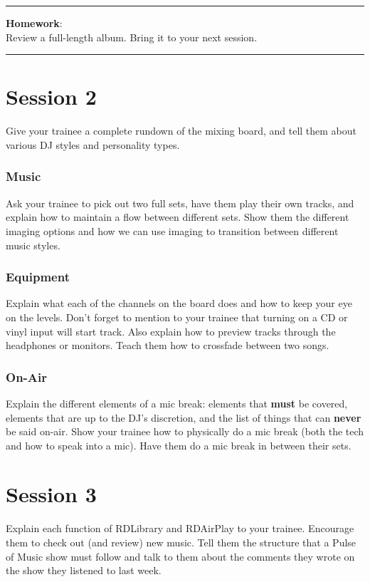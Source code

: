\documentclass{witrman}
\newcommand{\makehomework}[1]{%
\vspace{1mm}
\rule{\textwidth}{1pt}
\textbf{Homework}:\\
#1\\
\rule{\textwidth}{1pt}
}
\begin{document}
\makehomework{Review a full-length album.  Bring it to your next session.}


\chapter{Session 2}

Give your trainee a complete rundown of the mixing board, and tell them about
various DJ styles and personality types.

\subsection{Music}

Ask your trainee to pick out two full sets, have them play their own tracks, and
explain how to maintain a flow between different sets.  Show them the different
imaging options and how we can use imaging to transition between different music
styles.

\subsection{Equipment}

Explain what each of the channels on the board does and how to keep your eye on
the levels.  Don't forget to mention to your trainee that turning on a CD or
vinyl input will start track.  Also explain how to preview tracks through the
headphones or monitors.  Teach them how to crossfade between two songs.

\subsection{On-Air}

Explain the different elements of a mic break: elements that \textbf{must} be
covered, elements that are up to the DJ's discretion, and the list of things
that can \textbf{never} be said on-air.  Show your trainee how to physically do
a mic break (both the tech and how to speak into a mic).  Have them do a mic
break in between their sets.


\chapter{Session 3}

Explain each function of RDLibrary and RDAirPlay to your trainee.  Encourage
them to check out (and review) new music.  Tell them the structure that a Pulse
of Music show must follow and talk to them about the comments they wrote on the
show they listened to last week.
\end{document}
